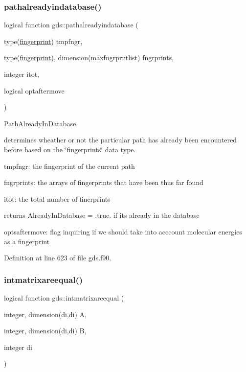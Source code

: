 \subsubsection{\texorpdfstring{pathalreadyindatabase()}{pathalreadyindatabase()}\hspace{0.1cm}{\footnotesize\ttfamily [1/2]}}
{\footnotesize\ttfamily logical function gds\+::pathalreadyindatabase (\begin{DoxyParamCaption}\item[{type(\mbox{\hyperlink{structrpath_1_1fingerprint}{fingerprint}})}]{tmpfngr,  }\item[{type(\mbox{\hyperlink{structrpath_1_1fingerprint}{fingerprint}}), dimension(maxfngrprntlist)}]{fngrprints,  }\item[{integer}]{itot,  }\item[{logical}]{optaftermove }\end{DoxyParamCaption})}



Path\+Already\+In\+Database. 

determines wheather or not the particular path has already been encountered before based on the \char`\"{}fingerprints\char`\"{} data type.


\begin{DoxyItemize}
\item tmpfngr\+: the fingerprint of the current path
\item fngrprints\+: the arrays of fingerprints that have been thus far found
\item itot\+: the total number of finerprints
\item returns Already\+In\+Database = .true. if its already in the database
\item optsaftermove\+: flag inquiring if we should take into acccount molecular energies as a fingerprint 
\end{DoxyItemize}

Definition at line 623 of file gds.\+f90.

\mbox{\label{namespacegds_aae15af5058102dda0da2ef57f771b5c9}} 
\subsubsection{\texorpdfstring{intmatrixareequal()}{intmatrixareequal()}}
{\footnotesize\ttfamily logical function gds\+::intmatrixareequal (\begin{DoxyParamCaption}\item[{integer, dimension(di,di)}]{A,  }\item[{integer, dimension(di,di)}]{B,  }\item[{integer}]{di }\end{DoxyParamCaption})}



